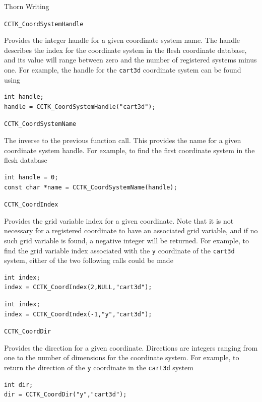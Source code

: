 \begin{cactuspart}{Thorn Writing}
\begin{Lentry}
\item[\texttt{CCTK\_CoordSystemHandle}]

Provides the integer handle for a given coordinate system name. The handle describes
the index for the coordinate system in the flesh coordinate database, and its value
will range between zero and the number of registered systems minus one. For example,
the handle for the \texttt{cart3d} coordinate system can be found using
%
\begin{verbatim}
int handle;
handle = CCTK_CoordSystemHandle("cart3d");
\end{verbatim}

\item[\texttt{CCTK\_CoordSystemName}]

The inverse to the previous function call. This provides the name for a given coordinate system handle.
For example, to find the first coordinate system in the flesh database
%
\begin{verbatim}
int handle = 0;
const char *name = CCTK_CoordSystemName(handle);
\end{verbatim}

\item[\texttt{CCTK\_CoordIndex}]

Provides the grid variable index for a given coordinate. Note that it is
not necessary for a registered coordinate to have an associated grid variable,
and if no such grid variable is found, a negative integer will be returned.
For example, to find the grid variable index associated with the \texttt{y}
coordinate of the \texttt{cart3d} system, either of the two following
calls could be made
%
\begin{verbatim}
int index;
index = CCTK_CoordIndex(2,NULL,"cart3d");
\end{verbatim}
%
\begin{verbatim}
int index;
index = CCTK_CoordIndex(-1,"y","cart3d");
\end{verbatim}


\item[\texttt{CCTK\_CoordDir}]

Provides the direction for a given coordinate. Directions are integers
ranging from one to the number of dimensions for the coordinate system.
For example, to return the direction of the \texttt{y} coordinate in
the \texttt{cart3d} system
%
\begin{verbatim}
int dir;
dir = CCTK_CoordDir("y","cart3d");
\end{verbatim}


\end{Lentry}
\end{cactuspart}
